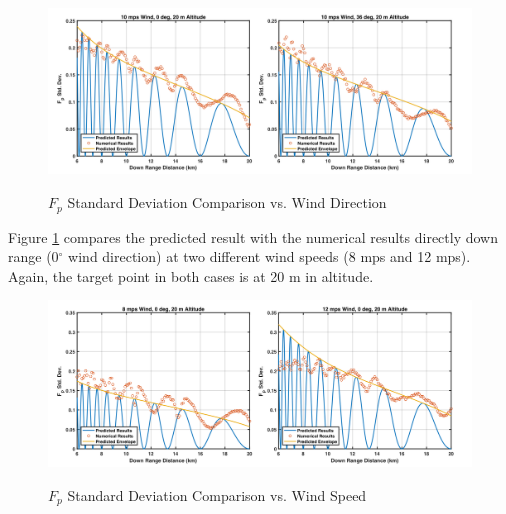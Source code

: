 \begin{figure}[H]
  \begin{center}
\includegraphics[width=6in]{../media/statistics/predicted_results_wind_direction.png}
  \end{center}
  \renewcommand{\baselinestretch}{1} \small\normalsize
  \begin{quote}
    \caption[$F_p$ Standard Deviation Comparison vs. Wind Direction]{$F_p$ Standard Deviation Comparison vs. Wind Direction\label{stat_fig:a1}}
  \end{quote}
\end{figure}
\renewcommand{\baselinestretch}{2} \small\normalsize

Figure \ref{stat_fig:a1} compares the predicted result with the numerical results directly down range (0$^{\circ}$ wind direction) at two different wind speeds (8 mps and 12 mps). Again, the target point in both cases is at 20 m in altitude.

\begin{figure}[H]
  \begin{center}
\includegraphics[width=6in]{../media/statistics/predicted_results_wind_speed.png}
  \end{center}
  \renewcommand{\baselinestretch}{1} \small\normalsize
  \begin{quote}
    \caption[$F_p$ Standard Deviation Comparison vs. Wind Speed]{$F_p$ Standard Deviation Comparison vs. Wind Speed\label{stat_fig:a2}}
  \end{quote}
\end{figure}
\renewcommand{\baselinestretch}{2} \small\normalsize 

